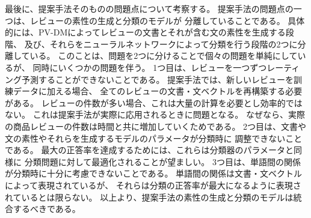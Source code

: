最後に、提案手法そのものの問題点について考察する。
提案手法の問題点の一つは、レビューの素性の生成と分類のモデルが
分離していることである。
具体的には、PV-DMによってレビューの文書とそれが含む文の素性を生成する段階、
及び、それらをニューラルネットワークによって分類を行う段階の2つに分離している。
このことは、問題を2つに分けることで個々の問題を単純にしているが、
同時にいくつかの問題を伴う。
1つ目は、レビューを一つずつレーティング予測することができないことである。
提案手法では、新しいレビューを訓練データに加える場合、
全てのレビューの文書・文ベクトルを再構築する必要がある。
レビューの件数が多い場合、これは大量の計算を必要とし効率的ではない。
これは提案手法が実際に応用されるときに問題となる。
なぜなら、実際の商品レビューの件数は時間と共に増加していくためである。
2つ目は、文書や文の素性やそれらを生成するモデルのパラメータが分類時に
調整できないことである。
最大の正答率を達成するためには、これらは分類器のパラメータと同様に
分類問題に対して最適化されることが望ましい。
3つ目は、単語間の関係が分類時に十分に考慮できないことである。
単語間の関係は文書・文ベクトルによって表現されているが、
それらは分類の正答率が最大になるように表現されているとは限らない。
以上より、提案手法の素性の生成と分類のモデルは統合するべきである。
